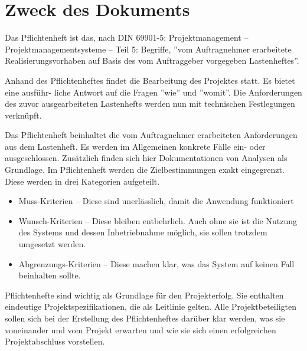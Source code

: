 \section*{Zweck des Dokuments}
Das Pflichtenheft ist das, nach DIN 69901-5: Projektmanagement – Projektmanagementsysteme – Teil 5: Begriffe, ”vom Auftragnehmer erarbeitete Realisierungsvorhaben auf Basis des vom Auftraggeber vorgegeben Lastenheftes”\cite{DIN69901-5}.\par

Anhand des Pflichtenheftes findet die Bearbeitung des Projektes statt. Es bietet eine ausführ- liche
Antwort auf die Fragen ”wie” und ”womit”. Die Anforderungen des zuvor ausgearbeiteten Lastenhefts werden nun mit technischen Festlegungen verknüpft.\par

Das Pflichtenheft beinhaltet die vom Auftragnehmer erarbeiteten Anforderungen aus dem Lastenheft. Es werden im Allgemeinen konkrete Fälle ein- oder ausgeschlossen. Zusätzlich finden sich hier Dokumentationen von Analysen als Grundlage. Im Pflichtenheft werden die Zielbestimmungen exakt eingegrenzt. Diese werden in drei Kategorien aufgeteilt. 
\begin{itemize}
    \item Muss-Kriterien -- Diese sind unerlässlich, damit die Anwendung funktioniert
    \item Wunsch-Kriterien -- Diese bleiben entbehrlich. Auch ohne sie ist die Nutzung des Systems und dessen Inbetriebnahme möglich, sie sollen trotzdem umgesetzt werden.
    \item Abgrenzungs-Kriterien -- Diese machen klar, was das System auf keinen Fall beinhalten sollte.
\end{itemize}

Pflichtenhefte sind wichtig als Grundlage für den Projekterfolg. Sie enthalten eindeutige Projektspezifikationen, die als Leitlinie gelten. Alle Projektbeteiligten sollen sich bei der Erstellung des Pflichtenheftes darüber klar werden, was sie voneinander und vom Projekt erwarten und wie sie sich einen erfolgreichen Projektabschluss vorstellen.\par

